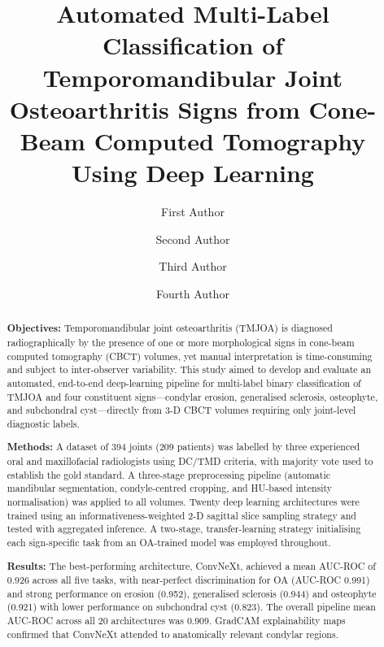 \documentclass[review,12pt]{elsarticle}
\begin{document}
\begin{frontmatter}

\title{Automated Multi-Label Classification of Temporomandibular Joint
Osteoarthritis Signs from Cone-Beam Computed Tomography Using Deep
Learning}

\author[musc]{First Author}

\author[mud]{Second Author}
\author[mud]{Third Author}
\author[mud]{Fourth Author}

\address[musc]{Department of Mathematics,
Faculty of Science, Mahidol University, Bangkok, Thailand}
\address[mud]{Department of Oral and Maxillofacial Radiology,
Faculty of Dentistry, Mahidol University, Bangkok, Thailand}

\begin{abstract}
\textbf{Objectives:}
Temporomandibular joint osteoarthritis (TMJOA) is diagnosed
radiographically by the presence of one or more morphological signs in
cone-beam computed tomography (CBCT) volumes, yet manual interpretation
is time-consuming and subject to inter-observer variability. This study
aimed to develop and evaluate an automated, end-to-end deep-learning
pipeline for multi-label binary classification of TMJOA and four constituent signs---condylar erosion, generalised sclerosis, osteophyte, and subchondral cyst---directly from 3-D CBCT volumes requiring only joint-level diagnostic labels.

\textbf{Methods:}
A dataset of 394 joints (209 patients) was labelled by three experienced
oral and maxillofacial radiologists using DC/TMD criteria, with majority
vote used to establish the gold standard. A three-stage preprocessing
pipeline (automatic mandibular segmentation, condyle-centred cropping, and
HU-based intensity normalisation) was applied to all volumes. Twenty deep
learning architectures were trained using an informativeness-weighted
2-D sagittal slice sampling strategy and tested with aggregated inference. A
two-stage, transfer-learning strategy initialising each sign-specific
task from an OA-trained model was employed throughout.

\textbf{Results:}
The best-performing architecture, ConvNeXt, achieved a mean AUC-ROC of 0.926 across all five tasks, with near-perfect discrimination for OA (AUC-ROC 0.991) and strong performance on erosion (0.952), generalised sclerosis (0.944) and osteophyte (0.921) with lower performance on subchondral cyst (0.823). The overall pipeline mean AUC-ROC across all 20 architectures was 0.909. GradCAM explainability maps confirmed that ConvNeXt attended to anatomically relevant condylar regions.


\end{abstract}
\end{frontmatter}
\end{document}
